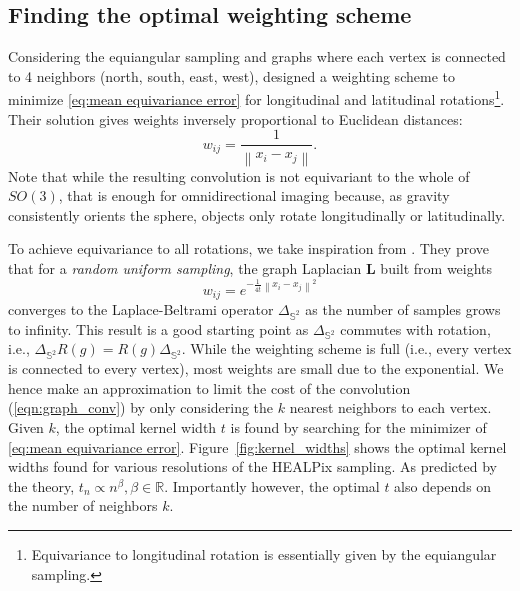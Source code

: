 \documentclass{article} %
\newcommand{\norm}[1]{\left\lVert#1\right\rVert}
\renewcommand{\b}[1]{{\bm{#1}}}  %
\newcommand{\R}{\mathbb{R}}
\newcommand{\Figref}[1]{Figure~\ref{fig:#1}}
\newcommand{\eqnref}[1]{(\ref{eqn:#1})}
\begin{document}
\subsection{Finding the optimal weighting scheme} \label{sec:optimal}

Considering the equiangular sampling and graphs where each vertex is connected to 4 neighbors (north, south, east, west), \citet{khasanova2017sphericalcnn} designed a weighting scheme to minimize \eqref{eq:mean equivariance error} for longitudinal and latitudinal rotations\footnote{Equivariance to longitudinal rotation is essentially given by the equiangular sampling.}.
Their solution gives weights inversely proportional to Euclidean distances:
\begin{equation} \label{eqn:weights:khasanova}
	w_{ij} = \frac{1}{\norm{x_i-x_j}}.
\end{equation}
Note that while the resulting convolution is not equivariant to the whole of $SO(3)$, that is enough for omnidirectional imaging because, as gravity consistently orients the sphere, objects only rotate longitudinally or latitudinally.

To achieve equivariance to all rotations, we take inspiration from \citet{belkin2005towards}.
They prove that for a \emph{random uniform sampling}, the graph Laplacian $\b{L}$ built from weights
\begin{equation} \label{eqn:weights:belkin}
	w_{ij} = e^{- \frac{1}{4t} \norm{x_i - x_j}^2}
\end{equation}
converges to the Laplace-Beltrami operator $\Delta_{\mathbb{S}^2}$ as the number of samples grows to infinity.
This result is a good starting point as $\Delta_{\mathbb{S}^2}$ commutes with rotation, i.e., $\Delta_{\mathbb{S}^2}R(g) = R(g)\Delta_{\mathbb{S}^2}$.
While the weighting scheme is full (i.e., every vertex is connected to every vertex), most weights are small due to the exponential.
We hence make an approximation to limit the cost of the convolution \eqnref{graph_conv} by only considering the $k$ nearest neighbors to each vertex.
Given $k$, the optimal kernel width $t$ is found by searching for the minimizer of \eqref{eq:mean equivariance error}.
\Figref{kernel_widths} shows the optimal kernel widths found for various resolutions of the HEALPix sampling.
As predicted by the theory, $t_n \propto n^\beta, \beta \in \R$.
Importantly however, the optimal $t$ also depends on the number of neighbors $k$.
\end{document}
